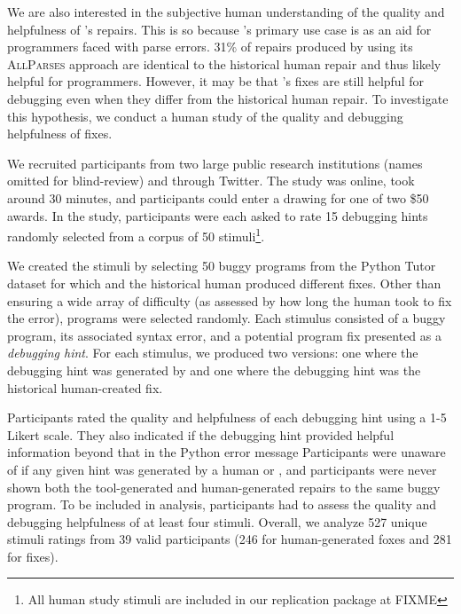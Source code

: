 We are also interested in the subjective human understanding of the quality 
and helpfulness of \toolname's repairs. 
This is so because \toolname's primary use case is as an aid for programmers 
faced with parse errors. 31\% of repairs produced by \toolname 
using its \textsc{AllParses} approach are identical to the historical human repair
and thus likely helpful for programmers. However, it may be that \toolname's fixes
are still helpful for debugging even when they differ from the historical human 
repair. To investigate this hypothesis, we conduct a human study of the quality and
debugging helpfulness of \toolname fixes.

 We recruited participants from two large public 
research institutions (names omitted for blind-review) and through Twitter. 
The study was online, took around 30 minutes, and participants could enter a 
drawing for one of two \$50 awards. In the study, participants 
were each asked to rate 15 debugging hints randomly selected from a corpus of 50 
stimuli\footnote{All human study stimuli are included in our replication 
package at FIXME}. 

We created the stimuli by selecting 50 buggy programs from the Python Tutor dataset 
for which \toolname and the historical human produced different fixes. Other than 
ensuring a wide array of difficulty (as assessed by how long the
human took to fix the error), programs were selected randomly. Each 
stimulus consisted of a buggy program, its associated syntax 
error, and a potential program fix presented as a \emph{debugging hint}. 
For each stimulus, we produced two versions: one where the debugging hint was 
generated by \toolname and one where the debugging hint was the historical 
human-created fix. 

Participants rated the quality and helpfulness of each debugging 
hint using a 1-5 Likert scale. 
They also indicated if the debugging hint provided helpful information beyond 
that in the Python error message %
Participants were unaware of if any given 
hint was generated by a human or \toolname, and participants were never shown both the 
tool-generated and human-generated repairs to the same buggy program. To be included 
in analysis, participants had to assess the quality and debugging helpfulness of at 
least four stimuli. Overall, we analyze 527 unique stimuli ratings from 39 valid 
participants (246 for human-generated foxes and 281 for \toolname fixes).


